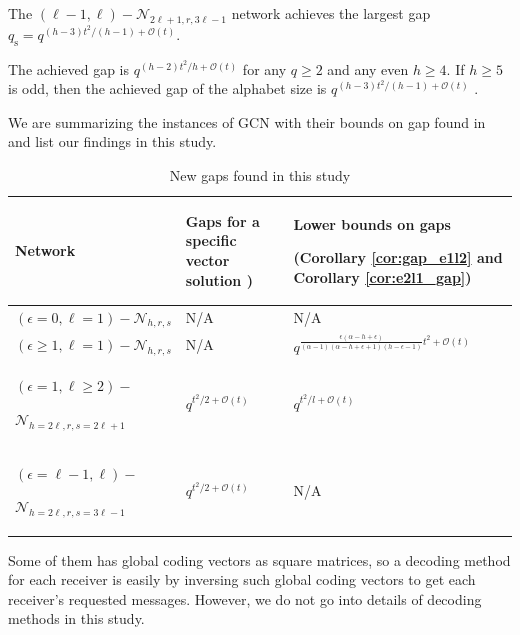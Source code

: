 The $\left(\ell-1,\ell\right)-\mathcal{N}_{2\ell+1,r,3\ell-1}$ network
achieves the largest gap $q_{\mathrm{s}}=q^{(h-3)t^{2}/\left(h-1\right)+\mathcal{O}(t)}$.
\begin{rem}
The achieved gap is $q^{(h-2)t^{2}/h+\mathcal{O}(t)}$ for any $q\geq2$
and any even $h\geq4$. If $h\geq5$ is odd, then the achieved gap
of the alphabet size is $q^{(h-3)t^{2}/\left(h-1\right)+\mathcal{O}(t)}$
\cite{Wachter-Zeh:2018}.
\end{rem}
We are summarizing the instances of GCN with their bounds on gap found
in \cite{Wachter-Zeh:2018} and list our findings in this study.
\begin{table}

\caption{New gaps found in this study \label{tab:New-gap-found}}

\begin{centering}
\begin{tabular}{|>{\centering}p{0.15\paperwidth}|>{\centering}p{0.1\paperwidth}|>{\centering}p{0.2\paperwidth}|}
\hline 
\centering{}Network & \centering{}Gaps for a specific vector solution \cite{Wachter-Zeh:2018}) & \begin{centering}
Lower bounds on gaps 
\par\end{centering}
\centering{}(Corollary \ref{cor:gap_e1l2} and Corollary \ref{cor:e2l1_gap})\tabularnewline
\hline 
\hline 
\centering{}$\left(\epsilon=0,\ell=1\right)-\mathcal{N}_{h,r,s}$ & \centering{}N/A & \centering{}N/A\tabularnewline
\hline 
\centering{}$\left(\epsilon\geq1,\ell=1\right)-\mathcal{N}_{h,r,s}$ & \centering{}N/A & \centering{}$q^{\frac{\epsilon\left(\alpha-h+\epsilon\right)}{\left(\alpha-1\right)\left(\alpha-h+\epsilon+1\right)\left(h-\epsilon-1\right)}t^{2}+\mathcal{O}(t)}$\tabularnewline
\hline 
\begin{centering}
$(\epsilon=1,\ell\geq2)-$
\par\end{centering}
$\mathcal{N}_{h=2\ell,r,s=2\ell+1}$ & \centering{}$q^{t^{2}/2+\mathcal{O}\left(t\right)}$ & \centering{}$q^{t^{2}/l+\mathcal{O}\left(t\right)}$\tabularnewline
\hline 
\begin{centering}
$\left(\epsilon=\ell-1,\ell\right)-$
\par\end{centering}
$\mathcal{N}_{h=2\ell,r,s=3\ell-1}$ & \centering{}$q^{t^{2}/2+\mathcal{O}\left(t\right)}$ & \centering{}N/A\tabularnewline
\hline 
\end{tabular}
\par\end{centering}
\end{table}
Some of them has global coding vectors as square matrices, so a decoding
method for each receiver is easily by inversing such global coding
vectors to get each receiver's requested messages. However, we do
not go into details of decoding methods in this study.

\clearpage